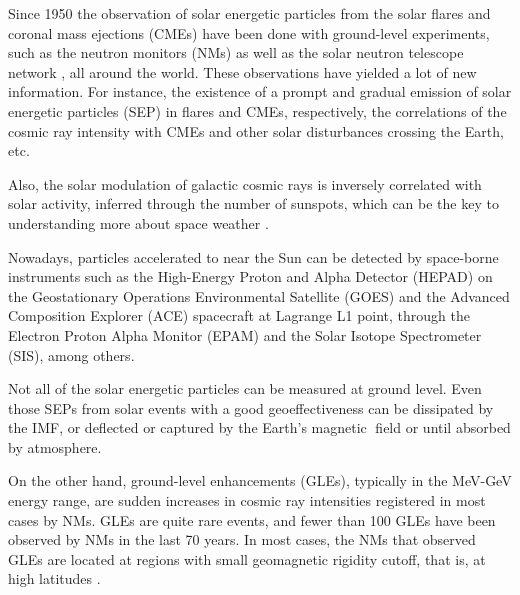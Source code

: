 \documentclass[twocolumn]{aastex63}
\begin{document}
Since 1950 the observation of solar energetic particles from the solar 
flares and coronal mass ejections (CMEs) have been done with ground-level experiments, such as the neutron monitors (NMs) \citep{meye56,simp00,mora00}
as well as the solar neutron telescope network \citep{hu22,vald09}, all around the world.
These observations have yielded a lot of new information. For instance, the existence of a prompt and gradual emission of solar energetic particles (SEP) in flares and CMEs, respectively, the correlations of the cosmic ray intensity with CMEs and other solar disturbances crossing the Earth, etc.
\citep{chup87,mora00}

 Also, the solar modulation of galactic cosmic rays is inversely correlated with solar activity, inferred through the number of sunspots, which can be the key to understanding more about space weather \citep{cade15}.

Nowadays, particles accelerated to near the Sun can be detected by space-borne instruments such as the High-Energy Proton
and Alpha Detector (HEPAD) on the Geostationary Operations Environmental Satellite (GOES) and the  Advanced Composition Explorer (ACE) spacecraft at Lagrange L1 point, through the Electron Proton Alpha Monitor (EPAM) and the Solar Isotope Spectrometer (SIS), among others.

Not all of the solar energetic particles can be measured at ground level. Even those SEPs from solar events with a good geoeffectiveness can be dissipated by the IMF, or deflected or captured by the Earth's magnetic field or until absorbed by atmosphere.
 
 On the other hand, ground-level enhancements (GLEs), typically in the MeV-GeV energy range, are sudden increases in cosmic ray intensities registered in most cases by NMs. GLEs are quite rare events, and fewer than 100 GLEs have been observed by NMs in the last 70 years. In most cases, the NMs that observed GLEs are located at regions with small geomagnetic rigidity cutoff, that is, at high latitudes \citep{shea12}.
 
\end{document}
